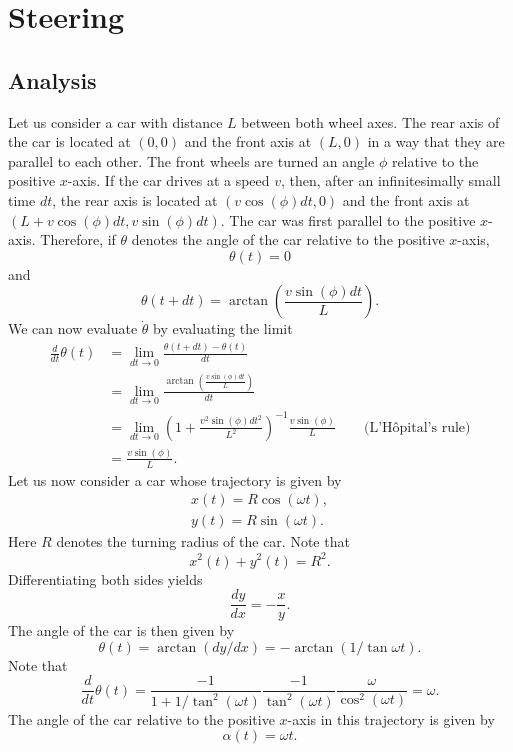 \documentclass[11pt,titlepage]{report}
\begin{document}
\newcommand{\mat}[1]{\mathbf{#1}}

\chapter*{Steering}
\section*{Analysis}
Let us consider a car with distance $L$ between both wheel axes. The rear axis of the car is located at $(0,0)$ and the front axis at $(L,0)$ in a way that they are parallel to each other. The front wheels are turned an angle $\phi$ relative to the positive $x$-axis. If the car drives at a speed $v$, then, after an infinitesimally small time $dt$, the rear axis is located at $(v \cos{(\phi)}dt,0)$ and the front axis at $(L+v \cos{(\phi)}dt,v \sin{(\phi)}dt)$. The car was first parallel to the positive $x$-axis. Therefore, if $\theta$ denotes the angle of the car relative to the positive $x$-axis,
\[
	\theta(t) = 0
\]
and
\[
	\theta(t+dt)=\arctan{\left(\frac{v \sin{(\phi)}dt}{L}\right)}.
\]
We can now evaluate $\dot{\theta}$ by evaluating the limit
\begin{align}
	\frac{d}{dt}\theta(t) &= \lim_{dt \rightarrow 0} \frac{\theta(t+dt)-\theta(t)}{dt} \nonumber \\
	&= \lim_{dt \rightarrow 0} \frac{\arctan{\left(\frac{v \sin{(\phi)}dt}{L}\right)}}{dt} \nonumber \\
	&= \lim_{dt \rightarrow 0} \left(1+\frac{v^2 \sin{(\phi)}dt^2}{L^2}\right)^{-1}\frac{v \sin{(\phi)}}{L} \quad \quad \text{(L'H\^opital's rule)} \nonumber \\
	&= \frac{v \sin{(\phi)}}{L}. \label{eq:steering-derivative}
\end{align}
Let us now consider a car whose trajectory is given by
\begin{align*}
	x(t) = R \cos{(\omega t)}, \\
	y(t) = R \sin{(\omega t)}.
\end{align*}
Here $R$ denotes the turning radius of the car. Note that
\[
	x^2(t)+y^2(t)=R^2.
\]
Differentiating both sides yields
\[
	\frac{dy}{dx}=-\frac{x}{y}.
\]
The angle of the car is then given by
\[
	\theta(t) = \arctan{(dy/dx)} = -\arctan{(1/\tan{\omega t})}.
\]
Note that
\[
	\frac{d}{dt} \theta(t) = \frac{-1}{1+1/\tan^2{(\omega t)}} \frac{-1}{\tan^2{(\omega t)}} \frac{\omega}{\cos^2{(\omega t)}} = \omega.
\]
The angle of the car relative to the positive $x$-axis in this trajectory is given by
\[
	\alpha(t) = \omega t.
\]
\end{document}
